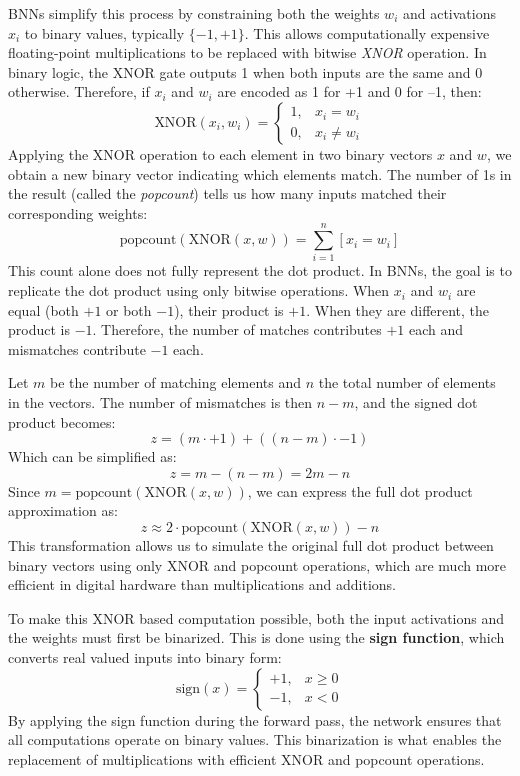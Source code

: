 \documentclass[a4paper,12pt]{report}
\begin{document}
BNNs simplify this process by constraining both the weights \(w_i\) and activations \(x_i\) to binary values, typically \( \{-1, +1\} \). This allows computationally expensive floating-point multiplications to be replaced with bitwise \textit{XNOR} operation. In binary logic, the XNOR gate outputs 1 when both inputs are the same and 0 otherwise. Therefore, if \(x_i\) and \(w_i\) are encoded as 1 for +1 and 0 for –1, then:
\[\text{XNOR}(x_i, w_i) = 
\begin{cases}
1, & x_i = w_i \\
0, & x_i \neq w_i
\end{cases}\]
Applying the XNOR operation to each element in two binary vectors \(x\) and \(w\), we obtain a new binary vector indicating which elements match. The number of 1s in the result (called the \textit{popcount}) tells us how many inputs matched their corresponding weights:
\[\text{popcount}(\text{XNOR}(x, w)) = \sum_{i=1}^n [x_i = w_i]\]
This count alone does not fully represent the dot product. In BNNs, the goal is to replicate the dot product using only bitwise operations. When \(x_i\) and \(w_i\) are equal (both \(+1\) or both \(-1\)), their product is \(+1\). When they are different, the product is \(-1\). Therefore, the number of matches contributes \(+1\) each and mismatches contribute \(-1\) each.

Let \(m\) be the number of matching elements and \(n\) the total number of elements in the vectors. The number of mismatches is then \(n - m\), and the signed dot product becomes:
\[z = (m \cdot +1) + ((n - m) \cdot -1)\]
Which can be simplified as:
\[z = m - (n - m) = 2m - n\]
Since \(m = \text{popcount}(\text{XNOR}(x, w))\), we can express the full dot product approximation as:
\[z \approx 2 \cdot \text{popcount}(\text{XNOR}(x, w)) - n\]
This transformation allows us to simulate the original full dot product between binary vectors using only XNOR and popcount operations, which are much more efficient in digital hardware than multiplications and additions.

To make this XNOR based computation possible, both the input activations and the weights must first be binarized. This is done using the \textbf{sign function}, which converts real valued inputs into binary form:
\[\text{sign}(x) = 
\begin{cases}
+1, & x \geq 0 \\
-1, & x < 0
\end{cases}\]
By applying the sign function during the forward pass, the network ensures that all computations operate on binary values. This binarization is what enables the replacement of multiplications with efficient XNOR and popcount operations.
\end{document}
